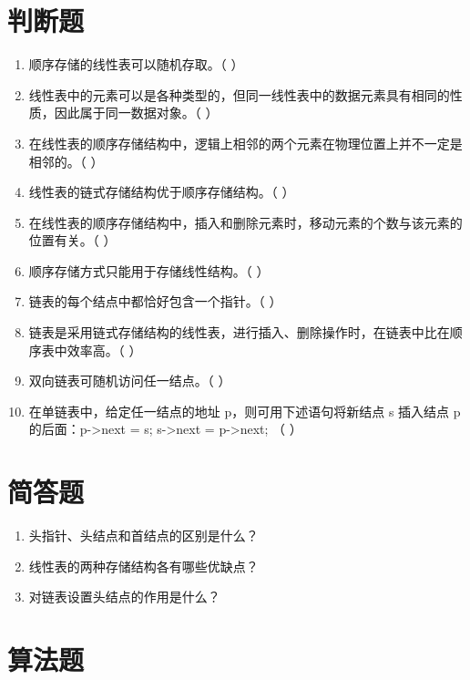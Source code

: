 \documentclass[12pt, a4paper]{article}
\begin{document}
\section*{判断题}

\begin{enumerate}
	\item 顺序存储的线性表可以随机存取。（ ）
	\item 线性表中的元素可以是各种类型的，但同一线性表中的数据元素具有相同的性质，因此属于同一数据对象。（ ）
	\item 在线性表的顺序存储结构中，逻辑上相邻的两个元素在物理位置上并不一定是相邻的。（ ）
	\item 线性表的链式存储结构优于顺序存储结构。（ ）
	\item 在线性表的顺序存储结构中，插入和删除元素时，移动元素的个数与该元素的位置有关。（ ）
	\item 顺序存储方式只能用于存储线性结构。（ ）
	\item 链表的每个结点中都恰好包含一个指针。（ ）
	\item 链表是采用链式存储结构的线性表，进行插入、删除操作时，在链表中比在顺序表中效率高。（ ）
	\item 双向链表可随机访问任一结点。（ ）
	\item 在单链表中，给定任一结点的地址 p，则可用下述语句将新结点 s 插入结点 p 的后面：p->next = s; s->next = p->next; （ ）
\end{enumerate}

\section*{简答题}

\begin{enumerate}
	\item 头指针、头结点和首结点的区别是什么？
	\item 线性表的两种存储结构各有哪些优缺点？
	\item 对链表设置头结点的作用是什么？
\end{enumerate}

\section*{算法题}
\end{document}
